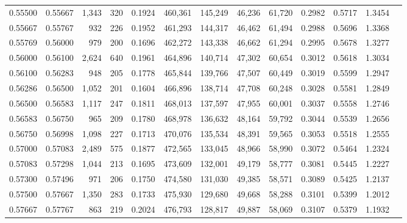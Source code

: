 \begin{tabular}{rrrrrrrrrrrrr}
0.55500 & 0.55667 & 1,343 & 320 &                                     0.1924 & 460,361 & 145,249 &  46,236 &  61,720 & 0.2982 & 0.5717 & 1.3454 \\
0.55667 & 0.55767 &   932 & 226 &                                     0.1952 & 461,293 & 144,317 &  46,462 &  61,494 & 0.2988 & 0.5696 & 1.3368 \\
0.55769 & 0.56000 &   979 & 200 &                                     0.1696 & 462,272 & 143,338 &  46,662 &  61,294 & 0.2995 & 0.5678 & 1.3277 \\
0.56000 & 0.56100 & 2,624 & 640 &                                     0.1961 & 464,896 & 140,714 &  47,302 &  60,654 & 0.3012 & 0.5618 & 1.3034 \\
0.56100 & 0.56283 &   948 & 205 &                                     0.1778 & 465,844 & 139,766 &  47,507 &  60,449 & 0.3019 & 0.5599 & 1.2947 \\
0.56286 & 0.56500 & 1,052 & 201 &                                     0.1604 & 466,896 & 138,714 &  47,708 &  60,248 & 0.3028 & 0.5581 & 1.2849 \\
0.56500 & 0.56583 & 1,117 & 247 &                                     0.1811 & 468,013 & 137,597 &  47,955 &  60,001 & 0.3037 & 0.5558 & 1.2746 \\
0.56583 & 0.56750 &   965 & 209 &                                     0.1780 & 468,978 & 136,632 &  48,164 &  59,792 & 0.3044 & 0.5539 & 1.2656 \\
0.56750 & 0.56998 & 1,098 & 227 &                                     0.1713 & 470,076 & 135,534 &  48,391 &  59,565 & 0.3053 & 0.5518 & 1.2555 \\
0.57000 & 0.57083 & 2,489 & 575 &                                     0.1877 & 472,565 & 133,045 &  48,966 &  58,990 & 0.3072 & 0.5464 & 1.2324 \\
0.57083 & 0.57298 & 1,044 & 213 &                                     0.1695 & 473,609 & 132,001 &  49,179 &  58,777 & 0.3081 & 0.5445 & 1.2227 \\
0.57300 & 0.57496 &   971 & 206 &                                     0.1750 & 474,580 & 131,030 &  49,385 &  58,571 & 0.3089 & 0.5425 & 1.2137 \\
0.57500 & 0.57667 & 1,350 & 283 &                                     0.1733 & 475,930 & 129,680 &  49,668 &  58,288 & 0.3101 & 0.5399 & 1.2012 \\
0.57667 & 0.57767 &   863 & 219 &                                     0.2024 & 476,793 & 128,817 &  49,887 &  58,069 & 0.3107 & 0.5379 & 1.1932 \\

\end{tabular}
